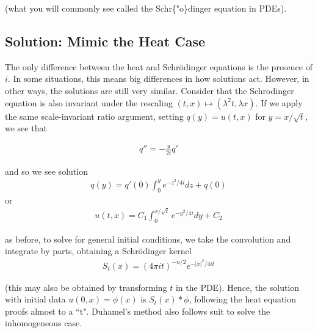 \documentclass{article}
\begin{document}
	(what you will commonly see called the Schr\{"o\}dinger equation in PDEs). 
	
	
	
	\subsection{Solution: Mimic the Heat Case}
	
	The only difference between the heat and Schr{\"o}dinger equations is the presence of $i$. In some situations, this means big differences in how solutions act. However, in other ways, the solutions are still very similar. Consider that the Schrodinger equation is also invariant under the rescaling $(t,x) \mapsto (\lambda^{2}t,\lambda x)$. If we apply the same scale-invariant ratio argument, setting $q(y) = u(t,x)$ for $y = x/\sqrt{t}$, we see that 
	
	\begin{align*}
		q'' = - \frac{y}{2i} q'
	\end{align*}
	
	and so we see solution 
	\begin{align*}
		q(y) = q'(0) \int_{0}^{y} e^{-z^{2}/4i} dz + q(0)
	\end{align*}
	or 
	\begin{align*}
		u(t,x) = C_{1} \int_{0}^{x/\sqrt{t}} e^{-y^{2}/4i} dy + C_{2}
	\end{align*}
	
	as before, to solve for general initial conditions, we take the convolution and integrate by parts, obtaining a Schr{\"o}dinger kernel
	\begin{align*}
		S_{t}(x) = (4\pi i t)^{-n/2} e^{-|x|^{2}/4it}
	\end{align*}
	
	(this may also be obtained by transforming $t$ in the PDE). Hence, the solution with initial data $u(0,x) = \phi(x)$ is $S_{t}(x) * \phi$, following the heat equation proofs almost to a ``t". Duhamel's method also follows suit to solve the inhomogeneous case. 
	
	
\end{document}
